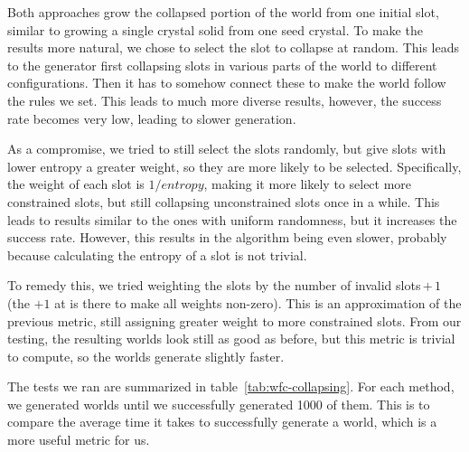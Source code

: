 Both approaches grow the collapsed portion of the world from one initial slot, similar to growing a single crystal solid from one seed crystal.
To make the results more natural, we chose to select the slot to collapse at random.
This leads to the generator first collapsing slots in various parts of the world to different configurations.
Then it has to somehow connect these to make the world follow the rules we set.
This leads to much more diverse results, however, the success rate becomes very low, leading to slower generation.

As a compromise, we tried to still select the slots randomly, but give slots with lower entropy a greater weight, so they are more likely to be selected.
Specifically, the weight of each slot is $1/entropy$, making it more likely to select more constrained slots, but still collapsing unconstrained slots once in a while.
This leads to results similar to the ones with uniform randomness, but it increases the success rate.
However, this results in the algorithm being even slower, probably because calculating the entropy of a slot is not trivial.

To remedy this, we tried weighting the slots by the number of invalid slots\,$+\,1$ (the $+1$ at is there to make all weights non-zero).
This is an approximation of the previous metric, still assigning greater weight to more constrained slots.
From our testing, the resulting worlds look still as good as before, but this metric is trivial to compute, so the worlds generate slightly faster.

The tests we ran are summarized in table~\ref{tab:wfc-collapsing}.
For each method, we generated worlds until we successfully generated 1000 of them.
This is to compare the average time it takes to successfully generate a world, which is a more useful metric for us.

